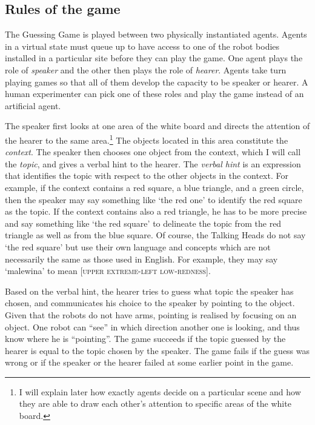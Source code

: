 \subsection{Rules of the game}

The Guessing Game is played between two 
physically instantiated agents. Agents in 
a virtual state must queue up to have access to one of the 
robot bodies installed in a particular site before
they can play the game. One agent 
plays the role of {\itshape speaker} and the other then plays the 
role of {\itshape hearer}. Agents take turn playing games 
so that all of them develop the capacity to be speaker or hearer.
A human experimenter can pick one of these roles and 
play the game instead of an artificial agent. 

The speaker first looks at one area of the white board and 
directs the attention of the hearer to the same area.\footnote{
I will explain later how exactly agents
decide on a particular scene and how they are able to 
draw each other's attention to specific areas of the 
white board.}
The objects located in this area constitute the {\itshape context}. 
The speaker then chooses one object from the context, which 
I will call the {\itshape topic}, and gives a verbal hint
to the hearer. The {\itshape verbal hint} is an expression
that identifies the topic 
with respect to the other objects in the context. For example, 
if the context contains a red square, a blue triangle, 
and a green circle, then the speaker may say something like 
`the red one' to identify the red square as the topic. 
If the context contains also a red triangle, he has to be more 
precise and say something like `the red square' to delineate
the topic from the red triangle as well as
from the blue square. 
Of course, the Talking Heads do not say `the red square'
but use their own language and concepts which are not 
necessarily the same as those used in English. For example, 
they may say `malewina' to mean [\textsc{upper extreme}-\textsc{left low}-\textsc{redness}]. 

Based on the verbal hint, the hearer tries to guess what
topic the speaker has chosen, and communicates his choice 
to the speaker by pointing to the object. Given that 
the robots do not have arms, pointing is realised by 
focusing on an object. One robot can ``see'' in which direction another one 
is looking, and thus know where he is ``pointing''. 
The game succeeds if the topic guessed by the hearer is 
equal to the topic chosen by the speaker. 
The game fails if the guess was wrong or 
if the speaker or the hearer failed at some earlier point in the 
game. 

